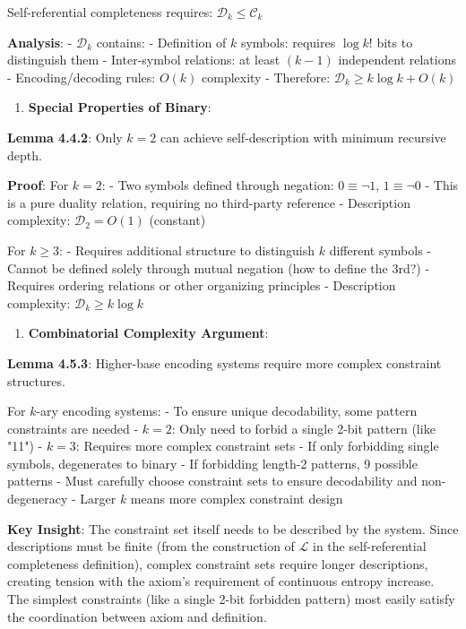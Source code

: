    Self-referential completeness requires: $\mathcal{D}_k \leq \mathcal{C}_k$
   
   \textbf{Analysis}:
   - $\mathcal{D}_k$ contains:
     - Definition of $k$ symbols: requires $\log k!$ bits to distinguish them
     - Inter-symbol relations: at least $(k-1)$ independent relations
     - Encoding/decoding rules: $O(k)$ complexity
   - Therefore: $\mathcal{D}_k \geq k \log k + O(k)$
   
\begin{enumerate}
\item \textbf{Special Properties of Binary}:
\end{enumerate}
   
   \textbf{Lemma 4.4.2}: Only $k=2$ can achieve self-description with minimum recursive depth.
\label{thm:2.5}
   
   \textbf{Proof}:
   For $k=2$:
   - Two symbols defined through negation: $0 \equiv \neg 1$, $1 \equiv \neg 0$
   - This is a pure duality relation, requiring no third-party reference
   - Description complexity: $\mathcal{D}_2 = O(1)$ (constant)
   
   For $k \geq 3$:
   - Requires additional structure to distinguish $k$ different symbols
   - Cannot be defined solely through mutual negation (how to define the 3rd?)
   - Requires ordering relations or other organizing principles
   - Description complexity: $\mathcal{D}_k \geq k \log k$

\begin{enumerate}
\item \textbf{Combinatorial Complexity Argument}:
\end{enumerate}
   
   \textbf{Lemma 4.5.3}: Higher-base encoding systems require more complex constraint structures.
\label{thm:2.5}
   
   For $k$-ary encoding systems:
   - To ensure unique decodability, some pattern constraints are needed
   - $k=2$: Only need to forbid a single 2-bit pattern (like "11")
   - $k=3$: Requires more complex constraint sets
     - If only forbidding single symbols, degenerates to binary
     - If forbidding length-2 patterns, 9 possible patterns
     - Must carefully choose constraint sets to ensure decodability and non-degeneracy
   - Larger $k$ means more complex constraint design
   
   \textbf{Key Insight}: The constraint set itself needs to be described by the system. Since descriptions must be finite (from the construction of $\mathcal{L}$ in the self-referential completeness definition), complex constraint sets require longer descriptions, creating tension with the axiom's requirement of continuous entropy increase. The simplest constraints (like a single 2-bit forbidden pattern) most easily satisfy the coordination between axiom and definition.
   
